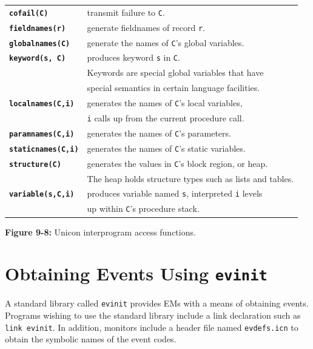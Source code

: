 \begin{center}

\begin{tabular}{|ll|} \hline
{\bf\tt cofail(C)}      & transmit failure to {\tt C}. \\
{\bf\tt fieldnames(r)}  & generate fieldnames of record {\tt r}. \\
{\bf\tt globalnames(C)} & generate the names of {\tt C}'s global
variables. \\
{\bf\tt keyword(s, C)} & produces keyword {\tt s} in {\tt C}. \\
	& Keywords are special global variables that have \\
	& special semantics in certain language facilities.\\
{\bf\tt localnames(C,i)} & generates the names of {\tt C}'s local variables,\\
	& {\tt i} calls up from the current procedure call. \\
{\bf\tt paramnames(C,i)} & generates the names of {\tt C}'s parameters. \\
{\bf\tt staticnames(C,i)} & generates the names of {\tt C}'s static variables. \\
{\bf\tt structure(C)} & generates the values in {\tt C}'s block
region, or heap. \\
	 & The heap holds structure types such as lists and tables. \\
{\bf\tt variable(s,C,i)} & produces variable named {\tt s}, interpreted {\tt i} levels\\
	& up within {\tt C}'s procedure stack. \\
\hline
\end{tabular}
\end{center}
\medskip

{\sffamily\bfseries Figure 9-8:}
{\sffamily Unicon interprogram access functions.}

\bigskip



\section{Obtaining Events Using {\tt evinit}}

A standard library called {\tt evinit} provides EMs with
a means of obtaining events.  Programs wishing to use the
standard library include a link declaration such as {\tt link
evinit}.
In addition, monitors include a header file named {\tt evdefs.icn}
to obtain the symbolic names of the event codes.

